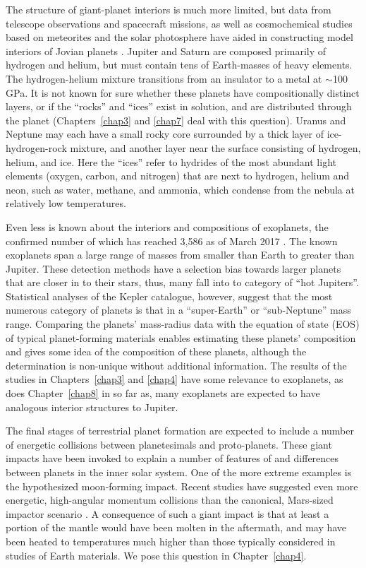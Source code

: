 The structure of giant-planet interiors is much more limited, but data from
telescope observations and spacecraft missions, as well as cosmochemical
studies based on meteorites and the solar photosphere have aided in
constructing model interiors of Jovian planets \cite{Guillot2004}. Jupiter and
Saturn are composed primarily of hydrogen and helium, but must contain tens of
Earth-masses of heavy elements. The hydrogen-helium mixture transitions from an
insulator to a metal at $\sim$100 GPa. It is not known for sure whether these
planets have compositionally distinct layers, or if the ``rocks'' and ``ices''
exist in solution, and are distributed through the planet (Chapters~\ref{chap3}
and \ref{chap7} deal with this question).  Uranus and Neptune may each have a
small rocky core surrounded by a thick layer of ice-hydrogen-rock mixture, and
another layer near the surface consisting of hydrogen, helium, and ice.  Here
the ``ices'' refer to hydrides of the most abundant light elements (oxygen,
carbon, and nitrogen) that are next to hydrogen, helium and neon, such as
water, methane, and ammonia, which condense from the nebula at relatively low
temperatures. 

Even less is known about the interiors and compositions of exoplanets, the
confirmed number of which has reached 3,586 as of March 2017 \cite{Schneider2011}.
The known exoplanets span a large range of masses from smaller than Earth to
greater than Jupiter.  These detection methods have a selection bias towards
larger planets that are closer in to their stars, thus, many fall into to
category of ``hot Jupiters''. Statistical analyses of the Kepler catalogue,
however, suggest that the most numerous category of planets is that in a
``super-Earth'' or ``sub-Neptune''  mass range. Comparing the planets'
mass-radius data with the equation of state (EOS) of typical planet-forming
materials enables estimating these planets' composition \cite{Seager2007} and gives
some idea of the composition of these planets, although the determination is
non-unique without additional information. The results of the studies in
Chapters~\ref{chap3} and \ref{chap4} have some relevance to exoplanets, as does
Chapter~\ref{chap8} in so far as, many exoplanets are expected to have
analogous interior structures to Jupiter.

The final stages of terrestrial planet formation are expected to include 
a number of energetic collisions between planetesimals and proto-planets. 
These giant impacts have been invoked to explain a number of features of and
differences between planets in the inner solar system. One of the more extreme
examples is the hypothesized moon-forming impact. Recent studies have suggested
even more energetic, high-angular momentum collisions \citep{Cuk2012,Canup2012} than the 
canonical, Mars-sized impactor scenario \citep{canup2004}. A consequence of 
such a giant impact is that at least a portion of the mantle would have been
molten in the aftermath, and may have been heated to temperatures
much higher than those typically considered in studies of Earth materials. 
We pose this question in Chapter~\ref{chap4}.

